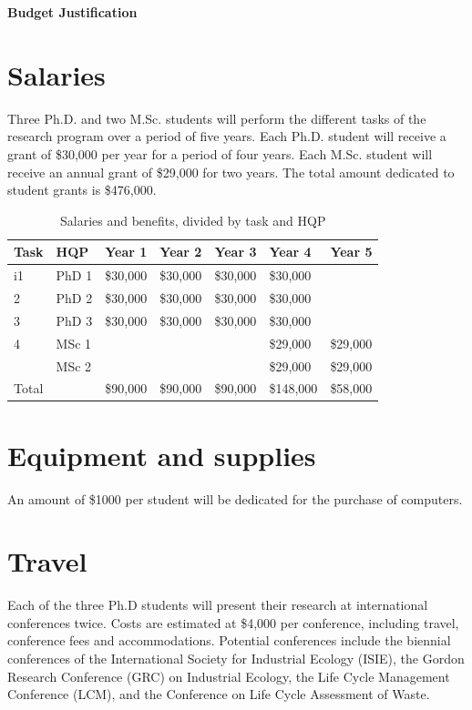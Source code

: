 \documentclass{nserc} %
\author{Guillaume Majeau-Bettez}
\begin{document}
\noindent \textbf{Budget Justification}
\\



\section{Salaries}

Three Ph.D. and two M.Sc. students will perform the different tasks of the research program over a period of five years. Each Ph.D. student will receive a grant of \$30,000 per year for a period of four years. Each M.Sc. student will receive an annual grant of \$29,000 for two years. The total amount dedicated to student grants is \$476,000.

\begin{table}[h]
	\centering
	\caption{Salaries and benefits, divided by task and HQP}
	\begin{tabular}{lllllll}
		\toprule
		Task&HQP&Year 1&Year 2&Year 3&Year 4&Year 5\\
		\midrule
		i1&PhD 1&\$30,000&\$30,000&\$30,000&\$30,000&\\
		2&PhD 2&\$30,000&\$30,000&\$30,000&\$30,000&\\
		3&PhD 3&\$30,000&\$30,000&\$30,000&\$30,000&\\
		4&MSc 1&&&&\$29,000&\$29,000\\
		&MSc 2&&&&\$29,000&\$29,000\\
		\midrule
		Total&&\$90,000&\$90,000&\$90,000&\$148,000&\$58,000\\
		\bottomrule
	\end{tabular}
	\label{tab_salaries}
\end{table}


\section{Equipment and supplies}

An amount of \$1000 per student will be dedicated for the purchase of computers.


\section{Travel}

Each of the three Ph.D students will present their research at international conferences twice. Costs are estimated at \$4,000 per conference, including travel, conference fees and accommodations. Potential conferences include the biennial conferences of the International Society for Industrial Ecology (ISIE), the Gordon Research Conference (GRC) on Industrial Ecology, the Life Cycle Management Conference (LCM), and the Conference on Life Cycle Assessment of Waste.
\end{document}
